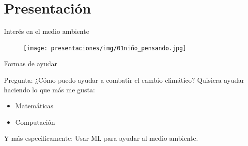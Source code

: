 \section{Presentación}
\begin{frame}{Interés en el medio ambiente}
\begin{figure}
    \centering
    \texttt{[image: presentaciones/img/01niño\_pensando.jpg]}
\end{figure}
\end{frame}

\begin{frame}{Formas de ayudar}
    \begin{block}{Pregunta: ¿Cómo puedo ayudar a combatir el cambio climático?}
    Quisiera ayudar haciendo lo que más me gusta:
    \begin{itemize}
        \item Matemáticas
        \item Computación
    \end{itemize}
    Y más especificamente: Usar ML para ayudar al medio ambiente.
    \end{block}
\end{frame}

